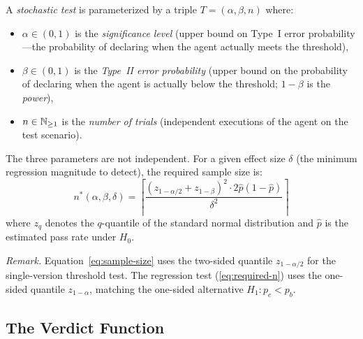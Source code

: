 \begin{definition}
\label{def:test-triple}
A \emph{stochastic test} is parameterized by a triple
$T = (\alpha, \beta, n)$ where:
\begin{itemize}[leftmargin=*]
  \item $\alpha \in (0, 1)$ is the \emph{significance level} (upper
    bound on Type~I error probability---the probability of declaring
    \FAIL{} when the agent actually meets the threshold),
  \item $\beta \in (0, 1)$ is the \emph{Type~II error probability}
    (upper bound on the probability of declaring \PASS{} when the agent
    is actually below the threshold; $1 - \beta$ is the \emph{power}),
  \item $n \in \mathbb{N}_{\geq 1}$ is the \emph{number of trials} (independent
    executions of the agent on the test scenario).
\end{itemize}
\end{definition}

The three parameters are not independent. For a given effect size
$\delta$ (the minimum regression magnitude to detect), the required
sample size is:
\begin{equation}
\label{eq:sample-size}
  n^*(\alpha, \beta, \delta) =
    \left\lceil
      \frac{(z_{1-\alpha/2} + z_{1-\beta})^2 \cdot
            2\hat{p}(1-\hat{p})}{\delta^2}
    \right\rceil
\end{equation}
where $z_q$ denotes the $q$-quantile of the standard normal distribution
and $\hat{p}$ is the estimated pass rate under $H_0$.

\noindent\textit{Remark.} Equation~\eqref{eq:sample-size} uses the
two-sided quantile $z_{1-\alpha/2}$ for the single-version threshold
test. The regression test (\cref{eq:required-n}) uses the one-sided
quantile $z_{1-\alpha}$, matching the one-sided alternative
$H_1: p_c < p_b$.

\subsection{The Verdict Function}
\label{sec:stochastic:verdict}

